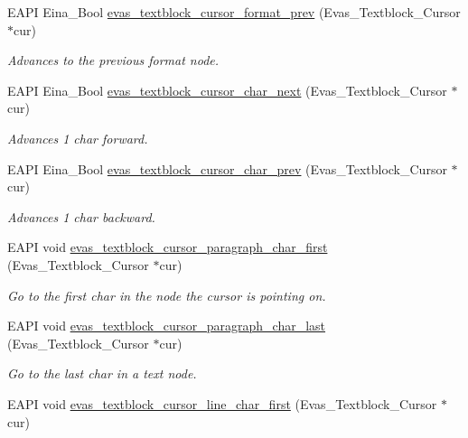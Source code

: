 \begin{DoxyCompactItemize}
EAPI Eina\_\-Bool \hyperlink{group__Evas__Object__Textblock_ga560593895b7ba6e3d309463c921ad9ec}{evas\_\-textblock\_\-cursor\_\-format\_\-prev} (Evas\_\-Textblock\_\-Cursor $\ast$cur)
\begin{DoxyCompactList}\small\item\em Advances to the previous format node. \item\end{DoxyCompactList}\item 
EAPI Eina\_\-Bool \hyperlink{group__Evas__Object__Textblock_ga8f3fba0d1d853db5694b3803db73d9cd}{evas\_\-textblock\_\-cursor\_\-char\_\-next} (Evas\_\-Textblock\_\-Cursor $\ast$cur)
\begin{DoxyCompactList}\small\item\em Advances 1 char forward. \item\end{DoxyCompactList}\item 
EAPI Eina\_\-Bool \hyperlink{group__Evas__Object__Textblock_gace122729e6764dc54bfee83b9865efc9}{evas\_\-textblock\_\-cursor\_\-char\_\-prev} (Evas\_\-Textblock\_\-Cursor $\ast$cur)
\begin{DoxyCompactList}\small\item\em Advances 1 char backward. \item\end{DoxyCompactList}\item 
EAPI void \hyperlink{group__Evas__Object__Textblock_ga14a0a29c79eeb378c73f1383bb09424d}{evas\_\-textblock\_\-cursor\_\-paragraph\_\-char\_\-first} (Evas\_\-Textblock\_\-Cursor $\ast$cur)
\begin{DoxyCompactList}\small\item\em Go to the first char in the node the cursor is pointing on. \item\end{DoxyCompactList}\item 
EAPI void \hyperlink{group__Evas__Object__Textblock_gaf504e62cf0b498631ec8154c14b2efb4}{evas\_\-textblock\_\-cursor\_\-paragraph\_\-char\_\-last} (Evas\_\-Textblock\_\-Cursor $\ast$cur)
\begin{DoxyCompactList}\small\item\em Go to the last char in a text node. \item\end{DoxyCompactList}\item 
EAPI void \hyperlink{group__Evas__Object__Textblock_ga6da9c7bff6073756a619f9b8a00d0e0b}{evas\_\-textblock\_\-cursor\_\-line\_\-char\_\-first} (Evas\_\-Textblock\_\-Cursor $\ast$cur)

\end{DoxyCompactItemize}
